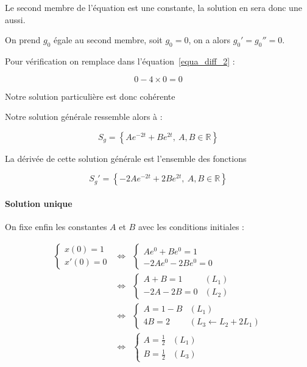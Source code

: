 \documentclass[a4paper, 11pt]{report} %
\newcommand{\R}{\mathbb{R}}
\begin{document}
Le second membre de l'équation est une constante, la solution en sera donc une aussi.

On prend $g_0$ égale au second membre, soit $g_0 = 0$, on a alors $g_0' = g_0'' = 0$.

Pour vérification on remplace dans l'équation~\ref{equa_diff_2} :

\[
0 - 4\times0 = 0
\]

Notre solution particulière est donc cohérente

Notre solution générale ressemble alors à :

\[
S_g = \left\{Ae^{-2t} + Be^{2t},~A,B\in\R\right\}
\]

La dérivée de cette solution générale est l'ensemble des fonctions

\[
S_g' = \left\{-2Ae^{-2t} + 2Be^{2t},~A,B\in\R\right\}
\]

\paragraph{Solution unique}
On fixe enfin les constantes $A$ et $B$ avec les conditions initiales :

\begin{eqnarray*}
\left\{\begin{array}{l}
x(0) = 1\\
x'(0) = 0
\end{array}\right. & \Leftrightarrow &
\left\{\begin{array}{l}
Ae^0 + Be^0 = 1\\
-2Ae^0 - 2Be^0 = 0
\end{array}\right.\\
& \Leftrightarrow &                     %
\left\{\begin{array}{ll}
A + B = 1 & (L_1)\\
-2A - 2B = 0 & (L_2)
\end{array}\right.\\
& \Leftrightarrow &                     %
\left\{\begin{array}{ll}
A = 1 - B & (L_1)\\
4B = 2 & (L_3 \leftarrow L_2 + 2L_1)
\end{array}\right.\\
& \Leftrightarrow &                     %
\left\{\begin{array}{ll}
A = \frac{1}{2} & (L_1)\\
B = \frac{1}{2} & (L_3)
\end{array}\right.\\
\end{eqnarray*}
\end{document}
